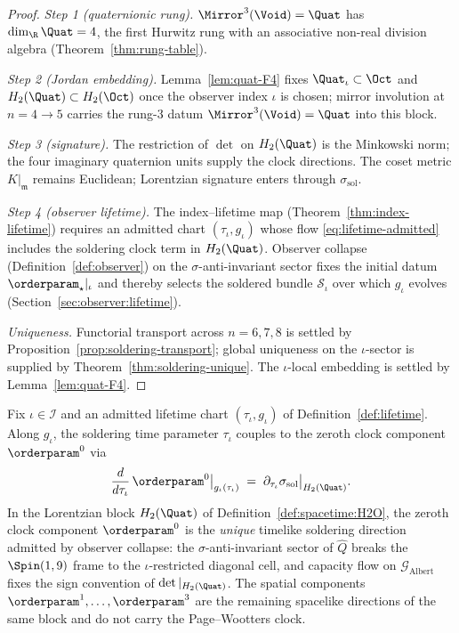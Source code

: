 \begin{proof}
\emph{Step 1 (quaternionic rung).} $\Mirror^3(\Void)=\Quat$ has
$\dim_{\R}\Quat=4$, the first Hurwitz rung with an associative non-real
division algebra (Theorem~\ref{thm:rung-table}).

\emph{Step 2 (Jordan embedding).} Lemma~\ref{lem:quat-F4} fixes
$\Quat_\iota\subset\Oct$ and $H_2(\Quat)\subset H_2(\Oct)$ once the
observer index $\iota$ is chosen; mirror involution at $n=4\to5$ carries
the rung-$3$ datum $\Mirror^3(\Void)=\Quat$ into this block.

\emph{Step 3 (signature).} The restriction of $\det$ on $H_2(\Quat)$ is the
Minkowski norm; the four imaginary quaternion units supply the clock
directions. The coset metric $K|_{\mathfrak{m}}$ remains Euclidean;
Lorentzian signature enters through $\sigma_{\mathrm{sol}}$.

\emph{Step 4 (observer lifetime).} The index--lifetime map
(Theorem~\ref{thm:index-lifetime}) requires an admitted chart
$(\tau_\iota,g_\iota)$ whose flow \eqref{eq:lifetime-admitted} includes the
soldering clock term in $H_2(\Quat)$. Observer collapse
(Definition~\ref{def:observer}) on the $\sigma$-anti-invariant sector fixes
the initial datum $\orderparam_\star|_\iota$ and thereby selects the soldered
bundle $\mathcal{S}_\iota$ over which $g_\iota$ evolves
(Section~\ref{sec:observer:lifetime}).

\emph{Uniqueness.} Functorial transport across $n=6,7,8$ is settled by
Proposition~\ref{prop:soldering-transport}; global uniqueness on the
$\iota$-sector is supplied by Theorem~\ref{thm:soldering-unique}. The
$\iota$-local embedding is settled by Lemma~\ref{lem:quat-F4}.
\end{proof}

\begin{proposition}
\label{prop:soldering-clock}
Fix $\iota\in\mathcal{I}$ and an admitted lifetime chart
$(\tau_\iota,g_\iota)$ of Definition~\ref{def:lifetime}. Along $g_\iota$,
the soldering time parameter $\tau_\iota$ couples to the zeroth clock
component $\orderparam^0$ via
\begin{equation}\label{eq:soldering-clock}
  \frac{d}{d\tau_\iota}\,\orderparam^0\big|_{g_\iota(\tau_\iota)}
  \;=\;
  \partial_{\tau_\iota}\sigma_{\mathrm{sol}}\big|_{H_2(\Quat)}.
\end{equation}
In the Lorentzian block $H_2(\Quat)$ of
Definition~\ref{def:spacetime:H2O}, the zeroth clock component
$\orderparam^0$ is the \emph{unique} timelike soldering direction admitted
by observer collapse: the $\sigma$-anti-invariant sector of $\hat Q$
breaks the $\Spin(1,9)$ frame to the $\iota$-restricted diagonal cell, and
capacity flow on $\mathcal{G}_{\mathrm{Albert}}$ fixes the sign convention
of $\det|_{H_2(\Quat)}$. The spatial components
$\orderparam^1,\ldots,\orderparam^3$ are the remaining spacelike directions
of the same block and do not carry the Page--Wootters clock.
\end{proposition}

